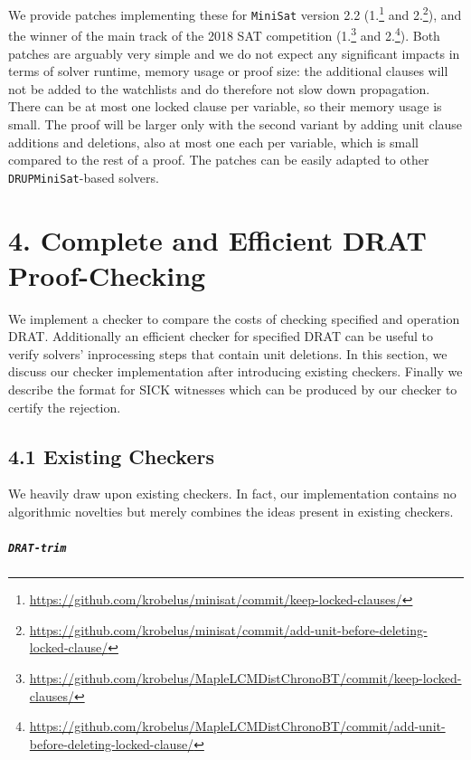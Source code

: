 \documentclass[
]{report}
\begin{document}
We provide patches implementing these for \texttt{MiniSat} version 2.2
(1.\footnote{\url{https://github.com/krobelus/minisat/commit/keep-locked-clauses/}}
and 2.\footnote{\url{https://github.com/krobelus/minisat/commit/add-unit-before-deleting-locked-clause/}}),
and the winner of the main track of the 2018 SAT competition
(1.\footnote{\url{https://github.com/krobelus/MapleLCMDistChronoBT/commit/keep-locked-clauses/}}
and 2.\footnote{\url{https://github.com/krobelus/MapleLCMDistChronoBT/commit/add-unit-before-deleting-locked-clause/}}).
Both patches are arguably very simple and we do not expect any
significant impacts in terms of solver runtime, memory usage or proof
size: the additional clauses will not be added to the watchlists and do
therefore not slow down propagation. There can be at most one locked
clause per variable, so their memory usage is small. The proof will be
larger only with the second variant by adding unit clause additions and
deletions, also at most one each per variable, which is small compared
to the rest of a proof. The patches can be easily adapted to other
\texttt{DRUPMiniSat}-based solvers.

\hypertarget{complete-and-efficient-drat-proof-checking}{%
\chapter{4. Complete and Efficient DRAT
Proof-Checking}\label{complete-and-efficient-drat-proof-checking}}

We implement a checker to compare the costs of checking specified and
operation DRAT. Additionally an efficient checker for specified DRAT can
be useful to verify solvers' inprocessing steps that contain unit
deletions. In this section, we discuss our checker implementation after
introducing existing checkers. Finally we describe the format for SICK
witnesses which can be produced by our checker to certify the rejection.

\hypertarget{existing-checkers}{%
\section{4.1 Existing Checkers}\label{existing-checkers}}

We heavily draw upon existing checkers. In fact, our implementation
contains no algorithmic novelties but merely combines the ideas present
in existing checkers.

\paragraph{\texttt{DRAT-trim}}
\end{document}
